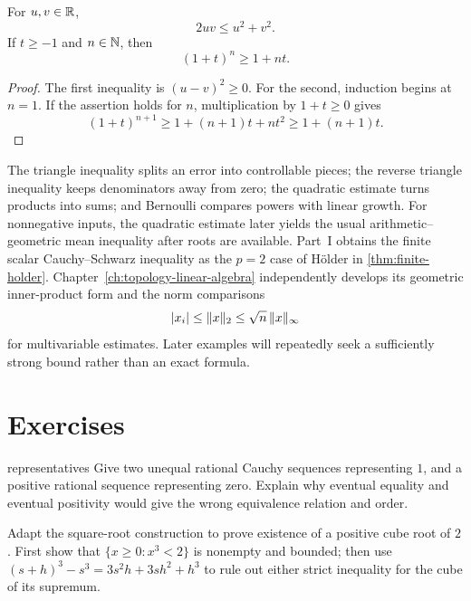 \begin{proposition}
\label{prop:quadratic-bernoulli}
For $u,v\in\mathbb{R}$,
\[
2uv\leq u^2+v^2.
\]
If $t\geq-1$ and $n\in\mathbb{N}$, then
\[
(1+t)^n\geq1+nt.
\]
\end{proposition}
\begin{proof}
The first inequality is $(u-v)^2\geq0$.  For the second, induction begins at $n=1$.
If the assertion holds for $n$, multiplication by $1+t\geq0$ gives
\[
(1+t)^{n+1}\geq1+(n+1)t+nt^2\geq1+(n+1)t.
\]
\end{proof}

\begin{remark}
The triangle inequality splits an error into controllable pieces; the
reverse triangle inequality keeps denominators away from zero; the quadratic
estimate turns products into sums; and Bernoulli compares powers with linear
growth.  For nonnegative inputs, the quadratic estimate later yields the
usual arithmetic--geometric mean inequality after roots are available.
Part~I obtains the finite scalar Cauchy--Schwarz inequality as the
\(p=2\) case of H\"older in \cref{thm:finite-holder}.
Chapter~\ref{ch:topology-linear-algebra} independently develops its
geometric inner-product form and the norm comparisons
\[
\lvert x_i\rvert\leq\lVert x\rVert_2\leq\sqrt n\,\lVert x\rVert_\infty
\]
for multivariable estimates.  Later examples will repeatedly seek a
sufficiently strong bound rather than an exact formula.
\end{remark}



\section*{Exercises}

\begin{hexercise}{representatives}
Give two unequal rational Cauchy sequences representing $1$, and a positive
rational sequence representing zero. Explain why eventual equality and
eventual positivity would give the wrong equivalence relation and order.
\end{hexercise}

\begin{exercise}
Adapt the square-root construction to prove existence of a positive cube
root of $2$. First show that $\{x\geq0:x^3<2\}$ is nonempty and bounded;
then use $(s+h)^3-s^3=3s^2h+3sh^2+h^3$ to rule out either strict
inequality for the cube of its supremum.
\end{exercise}

